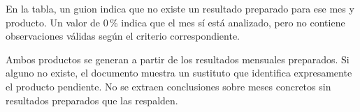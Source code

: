 En la tabla, un guion indica que no existe un resultado preparado para ese mes
y producto. Un valor de 0\,\% indica que el mes sí está analizado, pero no contiene
observaciones válidas según el criterio correspondiente.

Ambos productos se generan a partir de los resultados mensuales preparados. Si
alguno no existe, el documento muestra un sustituto que identifica expresamente
el producto pendiente. No se extraen conclusiones sobre meses concretos sin
resultados preparados que las respalden.
